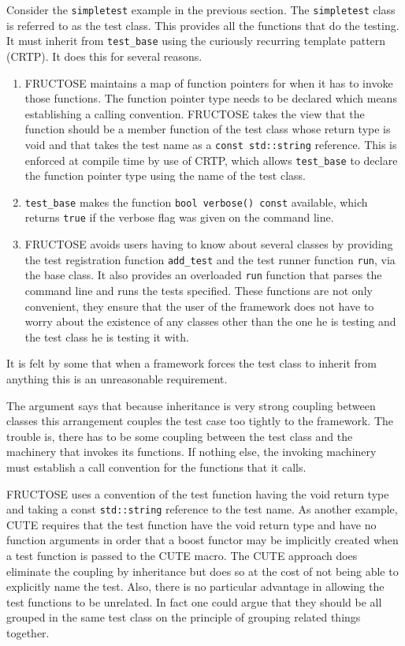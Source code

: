 \documentclass{book}
\begin{document}
Consider the {\tt simpletest} example in the previous section.
The {\tt simpletest} class is referred to as the test class. 
This provides all the functions that do the testing. 
It must inherit from {\tt test\_base} using
the curiously recurring template pattern (CRTP).
It does this for several reasons.
\begin{enumerate}
\item FRUCTOSE maintains a map of function pointers for when it has to 
invoke those functions. The function pointer type needs to be
declared which means establishing a calling convention.
FRUCTOSE takes the view that the function should be a member function
of the test class whose return type is void and that takes the test name
as a {\tt const std::string} reference.
This is enforced at compile time by use of CRTP,
which allows {\tt test\_base} to declare 
the function pointer type using the name of the test class.

\item {\tt test\_base} makes 
the function {\tt bool verbose() const} available,
which returns {\tt true} if the verbose flag was given on the command line.

\item FRUCTOSE avoids users having to know about several classes
by providing the test registration function {\tt add\_test}
and the test runner function {\tt run}, via the base class.
It also provides an overloaded {\tt run} function that parses the
command line and runs the tests specified.
These functions are not only convenient, they ensure that the user of the
framework does not have to worry about the existence of any classes other than
the one he is testing and the test class he is testing it with.
\end{enumerate}

It is felt by some that when a framework forces the test class to inherit
from anything this is an unreasonable requirement.

The argument says that because inheritance is very strong coupling
between classes this arrangement couples the test case too tightly
to the framework. The trouble is, there has to be some coupling
between the test class and the machinery that invokes its functions.
If nothing else, the invoking machinery must establish a 
call convention for the functions that it calls.

FRUCTOSE uses a convention of the test function having the void
return type and taking a const {\tt std::string} reference to the
test name.
As another example, CUTE requires that the test function have the
void return type and have no function arguments in order that a
boost functor may be implicitly created when a test function is
passed to the CUTE macro.
The CUTE approach does eliminate the coupling by inheritance
but does so at the cost of not being able to explicitly name
the test. Also, there is no particular advantage in allowing
the test functions to be unrelated. In fact one could argue that
they should be all grouped in the same test class on the
principle of grouping related things together.
\end{document}
